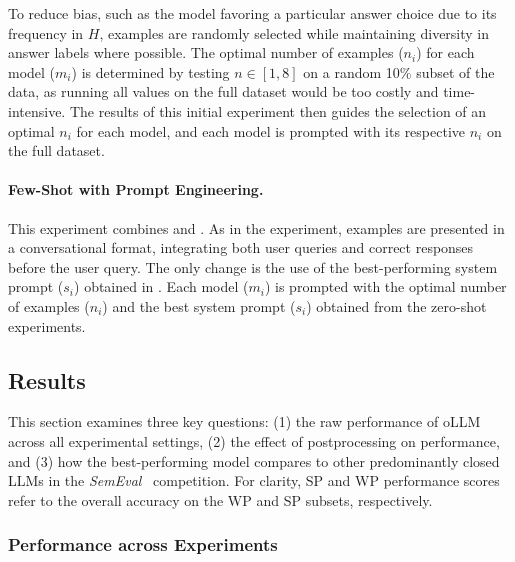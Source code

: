 To reduce bias, such as the model favoring a particular answer choice due to its frequency in $H$, examples are randomly selected while maintaining diversity in answer labels where possible. The optimal number of examples ($n_i$) for each model ($m_i$) is determined by testing $n \in [1, 8]$ on a random 10\% subset of the data, as running all values on the full dataset would be too costly and time-intensive. The results of this initial experiment then guides the selection of an optimal $n_i$ for each model, and each model is prompted with its respective $n_i$ on the full dataset.

\paragraph{Few-Shot with Prompt Engineering.}
\label{sec:few-shot-optimized}

This experiment combines  and . As in the  experiment, examples are presented in a conversational format, integrating both user queries and correct responses before the user query. The only change is the use of the best-performing system prompt ($s_i$) obtained in . Each model ($m_i$) is prompted with the optimal number of examples ($n_i$) and the best system prompt ($s_i$) obtained from the zero-shot experiments.

\subsection{Results}

This section examines three key questions: (1) the raw performance of \ac{oLLM} across all experimental settings, (2) the effect of postprocessing on performance, and (3) how the best-performing model compares to other predominantly closed \acp{LLM} in the \textit{SemEval}~\cite{jiangSemEval2024Task92024} competition.
\smallbreak
For clarity, \acs{SP} and \acs{WP} performance scores refer to the overall accuracy on the \acf{WP} and \acf{SP} subsets, respectively.

\subsubsection{Performance across Experiments}
\label{sec:performance-across-experiments}

